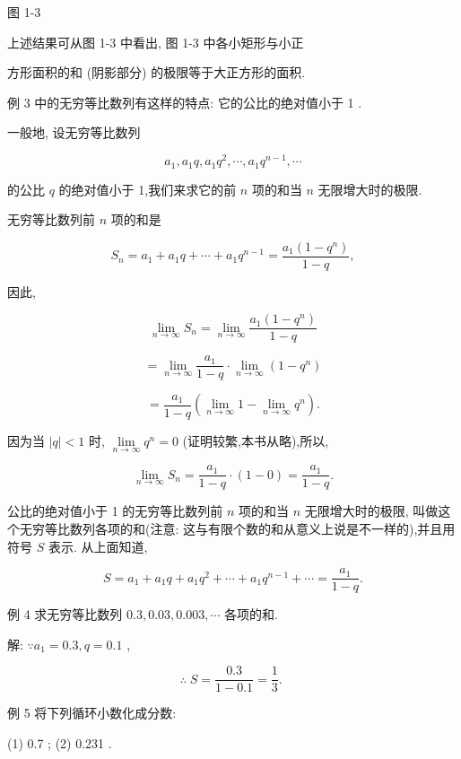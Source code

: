 \documentclass[lang=cn,newtx,10pt,scheme=chinese]{elegantbook}
\begin{document}
图 1-3

上述结果可从图 1-3 中看出, 图 1-3 中各小矩形与小正

方形面积的和 (阴影部分) 的极限等于大正方形的面积.

例 3 中的无穷等比数列有这样的特点: 它的公比的绝对值小于 1 .

一般地, 设无穷等比数列

\[
{a}_{1},{a}_{1}q,{a}_{1}{q}^{2},\cdots ,{a}_{1}{q}^{n - 1},\cdots
\]

的公比 \(q\) 的绝对值小于 1,我们来求它的前 \(n\) 项的和当 \(n\) 无限增大时的极限.

无穷等比数列前 \(n\) 项的和是

\[
{S}_{n} = {a}_{1} + {a}_{1}q + \cdots + {a}_{1}{q}^{n - 1} = \frac{{a}_{1}\left( {1 - {q}^{n}}\right) }{1 - q},
\]

因此,

\[
\mathop{\lim }\limits_{{n \rightarrow \infty }}{S}_{n} = \mathop{\lim }\limits_{{n \rightarrow \infty }}\frac{{a}_{1}\left( {1 - {q}^{n}}\right) }{1 - q}
\]

\[
= \mathop{\lim }\limits_{{n \rightarrow \infty }}\frac{{a}_{1}}{1 - q} \cdot \mathop{\lim }\limits_{{n \rightarrow \infty }}\left( {1 - {q}^{n}}\right)
\]

\[
= \frac{{a}_{1}}{1 - q}\left( {\mathop{\lim }\limits_{{n \rightarrow \infty }}1 - \mathop{\lim }\limits_{{n \rightarrow \infty }}{q}^{n}}\right) .
\]

因为当 \(\left| q\right| < 1\) 时, \(\mathop{\lim }\limits_{{n \rightarrow \infty }}{q}^{n} = 0\) (证明较繁,本书从略),所以,

\[
\mathop{\lim }\limits_{{n \rightarrow \infty }}{S}_{n} = \frac{{a}_{1}}{1 - q} \cdot \left( {1 - 0}\right) = \frac{{a}_{1}}{1 - q}.
\]

公比的绝对值小于 1 的无穷等比数列前 \(n\) 项的和当 \(n\) 无限增大时的极限, 叫做这个无穷等比数列各项的和(注意: 这与有限个数的和从意义上说是不一样的),并且用符号 \(S\) 表示. 从上面知道,

\[
S = {a}_{1} + {a}_{1}q + {a}_{1}{q}^{2} + \cdots + {a}_{1}{q}^{n - 1} + \cdots = \frac{{a}_{1}}{1 - q}.
\]

例 4 求无穷等比数列 \({0.3},{0.03},{0.003},\cdots\) 各项的和.

解: \(\because {a}_{1} = {0.3},q = {0.1}\) ,

\[
\therefore \;S = \frac{0.3}{1 - {0.1}} = \frac{1}{3}\text{. }
\]

例 5 将下列循环小数化成分数:

(1) 0.7 ; (2) 0.231 .
\end{document}
